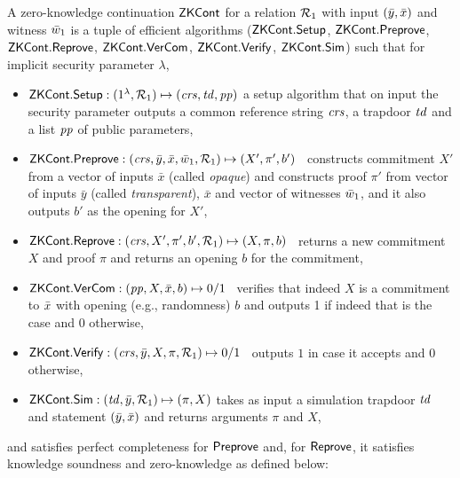 \begin{definition}[ZK Continuations]
\label{def:zk_cont}
 A zero-knowledge continuation ${\mathsf{ZKCont}}$ for a relation $\mathcal{R}_1$ with 
input $(\bar{y}, \bar{x})$ and witness $\bar{w}_1$ is a tuple of efficient algorithms 
(${\mathsf{ZKCont}}.{\mathsf{Setup}}$, ${\mathsf{ZKCont}}.{\mathsf{Preprove}}$, ${\mathsf{ZKCont}}.{\mathsf{Reprove}}$, 
${\mathsf{ZKCont}}.{\mathsf{VerCom}}$, ${\mathsf{ZKCont}}.{\mathsf{Verify}}$, ${\mathsf{ZKCont}}.{\mathsf{Sim}}$) 
such that for implicit security parameter $\lambda$,
\begin{itemize}

\item ${\mathsf{ZKCont}}.{\mathsf{Setup}}: (1^{\lambda}, \mathcal{R}_1) \mapsto (\mathit{crs}, \mathit{td}, \mathit{pp})$ a setup 
algorithm that on input the security parameter outputs a common reference 
string $\mathit{crs}$, a trapdoor $\mathit{td}$ and a list $\mathit{pp}$ of public parameters, 


\item ${\mathsf{ZKCont}}.{\mathsf{Preprove}}: (\mathit{crs}, \bar{y}, \bar{x}, \bar{w}_1, \mathcal{R}_1) \mapsto (X', \pi', b')$ \,
constructs commitment $X'$ from a vector of inputs $\bar{x}$ (called \emph{opaque}) and 
constructs proof $\pi'$ from vector of inputs $\bar{y}$ (called \emph{transparent}), 
$\bar{x}$ and vector of witnesses $\bar{w}_1$, and it also outputs $b'$ as the opening for $X'$,

\item ${\mathsf{ZKCont}}.{\mathsf{Reprove}}: (\mathit{crs}, X', \pi', b', \mathcal{R}_1) \mapsto (X, \pi, b)$ \,
returns a new commitment $X$ and proof $\pi$ and returns an opening $b$ for the commitment, 

\item ${\mathsf{ZKCont}}.{\mathsf{VerCom}}: (\mathit{pp}, X, \bar{x}, b) \mapsto 0/1$ \, 
verifies that indeed $X$ is a commitment to $\bar{x}$ with opening (e.g., randomness) $b$ and 
outputs 1 if indeed that is the case and 0 otherwise,
 
\item ${\mathsf{ZKCont}}.{\mathsf{Verify}}: (\mathit{crs}, \bar{y}, X, \pi, \mathcal{R}_1) \mapsto 0/1$ \, outputs $1$ in case it accepts  and $0$ otherwise,

\item ${\mathsf{ZKCont}}.{\mathsf{Sim}}: (\mathit{td}, \bar{y}, \mathcal{R}_1) \mapsto (\pi, X)$ takes as input a simulation trapdoor $\mathit{td}$ and statement $(\bar{y}, \bar{x})$ and returns 
arguments $\pi$ and $X$,
\end{itemize}
and satisfies perfect completeness for ${\mathsf{Preprove}}$ and, for ${\mathsf{Reprove}}$, it satisfies knowledge soundness and zero-knowledge as defined below:\\


\end{definition}
